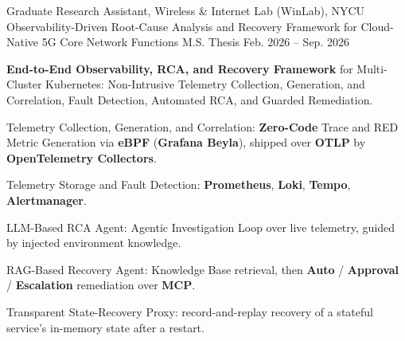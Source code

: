 
\begin{cventries}

  \cventry
    {Graduate Research Assistant, Wireless \& Internet Lab (WinLab), NYCU} %
    {Observability-Driven Root-Cause Analysis and Recovery Framework for Cloud-Native 5G Core Network Functions} %
    {M.S. Thesis} %
    {Feb. 2026 -- Sep. 2026} %
    {
      \begin{cvitems}
        \item {\textbf{End-to-End Observability, RCA, and Recovery Framework} for Multi-Cluster Kubernetes: Non-Intrusive Telemetry Collection, Generation, and Correlation, Fault Detection, Automated RCA, and Guarded Remediation.}
        \item {Telemetry Collection, Generation, and Correlation: \textbf{Zero-Code} Trace and RED Metric Generation via \textbf{eBPF} (\textbf{Grafana Beyla}), shipped over \textbf{OTLP} by \textbf{OpenTelemetry Collectors}.}
        \item {Telemetry Storage and Fault Detection: \textbf{Prometheus}, \textbf{Loki}, \textbf{Tempo}, \textbf{Alertmanager}.}
        \item {LLM-Based RCA Agent: Agentic Investigation Loop over live telemetry, guided by injected environment knowledge.}
        \item {RAG-Based Recovery Agent: Knowledge Base retrieval, then \textbf{Auto} / \textbf{Approval} / \textbf{Escalation} remediation over \textbf{MCP}.}
        \item {Transparent State-Recovery Proxy: record-and-replay recovery of a stateful service's in-memory state after a restart.}
      \end{cvitems}
    }


\end{cventries}
